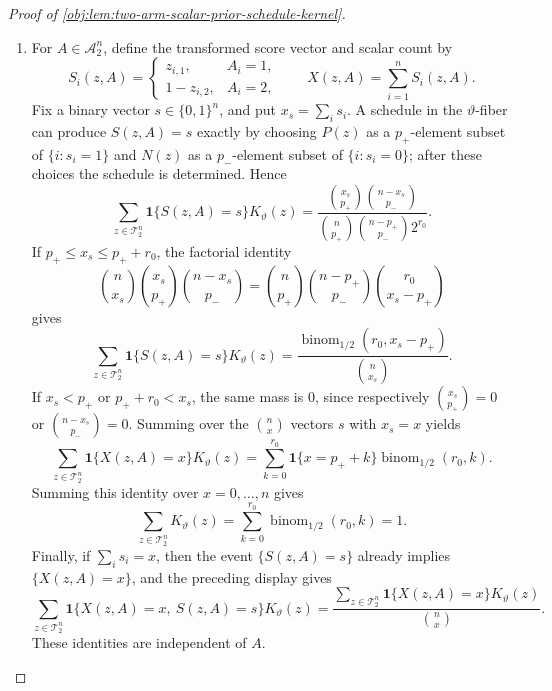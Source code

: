 \documentclass[11pt]{article}
\begin{document}
\begin{proof}[Proof of \cref{obj:lem:two-arm-scalar-prior-schedule-kernel}]
\begin{enumerate}
\item For \(A\in\mathcal A_2^n\), define the transformed score vector and scalar count by
\[
S_i(z,A)=
\begin{cases}
z_{i,1},&A_i=1,\\
1-z_{i,2},&A_i=2,
\end{cases}
\qquad
X(z,A)=\sum_{i=1}^n S_i(z,A).
\]
Fix a binary vector \(s\in\{0,1\}^n\), and put \(x_s=\sum_i s_i\).  A schedule in the \(\vartheta\)-fiber can produce \(S(z,A)=s\) exactly by choosing \(P(z)\) as a \(p_+\)-element subset of \(\{i:s_i=1\}\) and \(N(z)\) as a \(p_-\)-element subset of \(\{i:s_i=0\}\); after these choices the schedule is determined.  Hence
\[
\sum_{z\in\mathcal T_2^n}
\mathbf 1\{S(z,A)=s\}K_\vartheta(z)
=
\frac{\binom{x_s}{p_+}\binom{n-x_s}{p_-}}
{\binom n{p_+}\binom{n-p_+}{p_-}2^{r_0}}.
\]
If \(p_+\le x_s\le p_++r_0\), the factorial identity
\[
\binom n{x_s}\binom{x_s}{p_+}\binom{n-x_s}{p_-}
=
\binom n{p_+}\binom{n-p_+}{p_-}\binom{r_0}{x_s-p_+}
\]
gives
\[
\sum_{z\in\mathcal T_2^n}
\mathbf 1\{S(z,A)=s\}K_\vartheta(z)
=
\frac{\operatorname{binom}_{1/2}(r_0,x_s-p_+)}{\binom n{x_s}}.
\]
If \(x_s<p_+\) or \(p_++r_0<x_s\), the same mass is \(0\), since respectively \(\binom{x_s}{p_+}=0\) or \(\binom{n-x_s}{p_-}=0\).  Summing over the \(\binom n x\) vectors \(s\) with \(x_s=x\) yields
\[
\sum_{z\in\mathcal T_2^n}
\mathbf 1\{X(z,A)=x\}K_\vartheta(z)
=
\sum_{k=0}^{r_0}
\mathbf 1\{x=p_+ + k\}\operatorname{binom}_{1/2}(r_0,k).
\]
Summing this identity over \(x=0,\ldots,n\) gives
\[
\sum_{z\in\mathcal T_2^n}K_\vartheta(z)
=
\sum_{k=0}^{r_0}\operatorname{binom}_{1/2}(r_0,k)=1.
\]
Finally, if \(\sum_i s_i=x\), then the event \(\{S(z,A)=s\}\) already implies \(\{X(z,A)=x\}\), and the preceding display gives
\[
\sum_{z\in\mathcal T_2^n}
\mathbf 1\{X(z,A)=x,\ S(z,A)=s\}K_\vartheta(z)
=
\frac{
\sum_{z\in\mathcal T_2^n}\mathbf 1\{X(z,A)=x\}K_\vartheta(z)
}{
\binom n x
}.
\]
These identities are independent of \(A\). %


\end{enumerate}
\end{proof}
\end{document}
